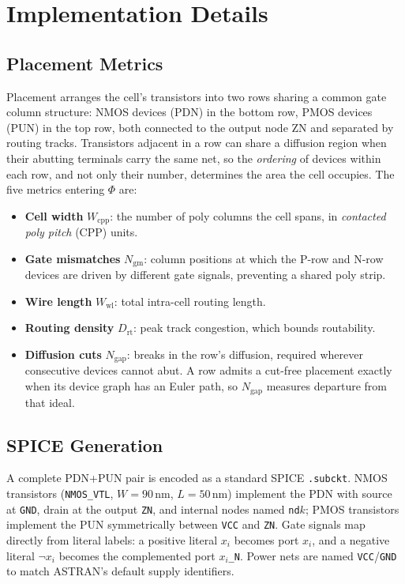 \documentclass[letterpaper]{article}
\theoremstyle{plain}
\theoremstyle{definition}
\begin{document}
\section{Implementation Details}
\label{app:impl}

\subsection{Placement Metrics}
\label{app:metrics}

Placement arranges the cell's transistors into two rows sharing a common gate
column structure: NMOS devices (PDN) in the bottom row, PMOS devices (PUN) in
the top row, both connected to the output node $\mathrm{ZN}$ and separated by
routing tracks.
Transistors adjacent in a row can share a diffusion region when their abutting
terminals carry the same net, so the \emph{ordering} of devices within each
row, and not only their number, determines the area the cell occupies.
The five metrics entering $\Phi$ are:

\begin{itemize}[leftmargin=*, topsep=2pt, itemsep=0pt]
  \item \textbf{Cell width} $W_{\mathrm{cpp}}$: the number of poly columns the
        cell spans, in \emph{contacted poly pitch} (CPP) units.
  \item \textbf{Gate mismatches} $N_{\mathrm{gm}}$: column positions at which
        the P-row and N-row devices are driven by different gate signals,
        preventing a shared poly strip.
  \item \textbf{Wire length} $W_{\mathrm{wl}}$: total intra-cell routing
        length.
  \item \textbf{Routing density} $D_{\mathrm{rt}}$: peak track congestion,
        which bounds routability.
  \item \textbf{Diffusion cuts} $N_{\mathrm{gap}}$: breaks in the row's
        diffusion, required wherever consecutive devices cannot abut.
        A row admits a cut-free placement exactly when its device graph has an
        Euler path, so $N_{\mathrm{gap}}$ measures departure from that ideal.
\end{itemize}

\subsection{SPICE Generation}

A complete PDN+PUN pair is encoded as a standard SPICE \texttt{.subckt}.
NMOS transistors (\texttt{NMOS\_VTL}, $W = 90\,$nm, $L = 50\,$nm) implement
the PDN with source at \texttt{GND}, drain at the output \texttt{ZN}, and
internal nodes named \texttt{nd$k$}; PMOS transistors implement the PUN
symmetrically between \texttt{VCC} and \texttt{ZN}.
Gate signals map directly from literal labels: a positive literal $x_i$
becomes port \texttt{$x_i$}, and a negative literal $\lnot x_i$ becomes the
complemented port \texttt{$x_i$\_N}.
Power nets are named \texttt{VCC}/\texttt{GND} to match ASTRAN's default
supply identifiers.
\end{document}
